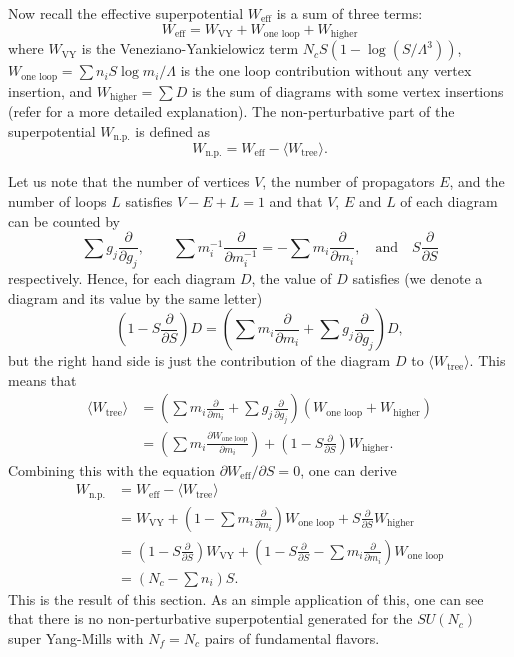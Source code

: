 \documentclass[a4paper,12pt]{article}
\def\ex#1{\langle#1\rangle}
\def\W#1{W_{\text{#1}}}
\def\SU{SU}
\begin{document}
Now recall the effective superpotential $\W{eff}$ is a sum of three terms:
\begin{equation}
\W{eff}=\W{VY}+\W{one loop}+\W{higher}
\end{equation}
where $\W{VY}$ is the Veneziano-Yankielowicz term
$N_cS(1-\log(S/\Lambda^3))$, $\W{one loop}=\sum n_i S\log m_i/\Lambda$
is the one loop contribution without any vertex insertion,
and $\W{higher}=\sum D$ is the sum of diagrams with some vertex insertions
(refer \cite{Tachikawa:2002wk} for a more detailed explanation).
The non-perturbative part of the superpotential $\W{n.p.}$ is defined as
\begin{equation}
\W{n.p.}=\W{eff}-\ex{\W{tree}}.
\end{equation}

Let us note that the number of vertices $V$, the number of propagators $E$, 
and the number of loops $L$ satisfies $V-E+L=1$ and that
$V$, $E$ and  $L$ of each diagram
can be counted by \begin{equation}
\sum g_j\frac\partial{\partial g_j},
\qquad
\sum m_i^{-1}\frac{\partial}{\partial m_i^{-1}}
=-\sum m_i\frac{\partial}{\partial m_i},
\quad \text{and} \quad
S\frac{\partial}{\partial S}
\end{equation}respectively. Hence, for each diagram $D$, the value of $D$ satisfies
(we denote a diagram and its value by the same letter)\begin{equation}
\left(1-S\frac{\partial}{\partial S}\right)D
=\left(\sum m_i\frac{\partial}{\partial m_i}
+\sum g_j\frac\partial{\partial g_j}\right)D,
\end{equation} but the right hand side is just the contribution of the diagram $D$
to $\ex{\W{tree}}$. This means that \begin{align}
\ex{\W{tree}}&=\left(\sum m_i\frac{\partial}{\partial m_i}
+\sum g_j\frac\partial{\partial g_j}\right)(\W{one loop}+\W{higher})\nonumber\\
&=\left(\sum m_i\frac{\partial\W{one loop}}{\partial m_i}\right)+
\left(1-S\frac{\partial}{\partial S}\right)\W{higher}.
\end{align}Combining this with the equation $\partial\W{eff}/\partial S=0$,
one can derive\begin{align}
\W{n.p.}&=\W{eff}-\ex{\W{tree}}\nonumber\\
&=\W{VY}+\left(1-\sum m_i\frac{\partial}{\partial m_i}\right)\W{one loop}
+S\frac{\partial}{\partial S}\W{higher}\nonumber\\
&=\left(1-S\frac{\partial}{\partial S}\right)\W{VY}+\left(1-S\frac{\partial}{\partial S}-\sum m_i\frac{\partial}{\partial m_i}\right)\W{one loop}\nonumber\\
&=(N_c-\sum n_i)S.
\end{align}
This is the result of this section.
As an simple application of this, one can see that there is no 
non-perturbative superpotential generated for the $\SU(N_c)$
super Yang-Mills with $N_f=N_c$ pairs of fundamental flavors.
\end{document}
